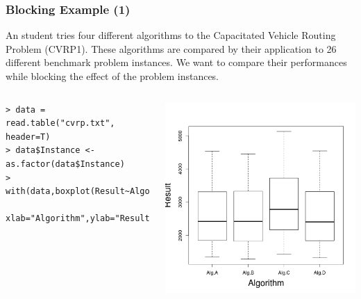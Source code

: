 \documentclass[10pt]{beamer}
\begin{document}
\begin{frame}
  \frametitle{Blocking Example (1)}
  \begin{block}{}
    An student tries four different algorithms to the Capacitated
    Vehicle Routing Problem (CVRP1). These algorithms are compared by
    their application to 26 different benchmark problem instances. We
    want to compare their performances while blocking the effect of
    the problem instances.
  \end{block}

  \begin{columns}[c]
{\smaller
\begin{verbatim}
> data = read.table("cvrp.txt", header=T)
> data$Instance <- as.factor(data$Instance)
> with(data,boxplot(Result~Algorithm,
       xlab="Algorithm",ylab="Result",cex.lab=1.8))
\end{verbatim}}
    \includegraphics[width=1\textwidth]{img/cvrp1}
  \end{columns}
\end{frame}
\end{document}
